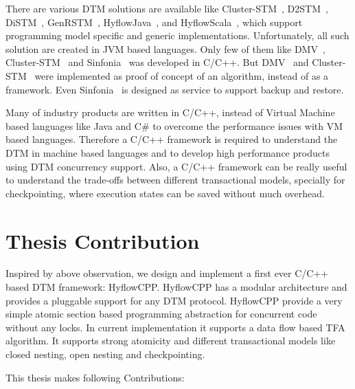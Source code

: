 \documentclass[12pt,english]{report}
\begin{document}
There are various DTM solutions are available like Cluster-STM~\cite{Bocchino:2008:STM:1345206.1345242}, D2STM~\cite{D2STM:5368778}, DiSTM~\cite{Kotselidis08distm:a}, GenRSTM~\cite{GenRSTM:6038614}, HyflowJava~\cite{Saad:2011:HHP:1996130.1996167}, and HyflowScala~\cite{turcuhyflow2}, which support programming model specific and generic implementations. Unfortunately, all such solution are created in JVM based languages. Only few of them like DMV~\cite{Manassiev:2006:EDV:1122971.1123002}, Cluster-STM~\cite{Bocchino:2008:STM:1345206.1345242} and Sinfonia~\cite{Aguilera:2009:SNP:1629087.1629088}  was developed in C/C++. But DMV~\cite{Manassiev:2006:EDV:1122971.1123002} and Cluster-STM~\cite{Bocchino:2008:STM:1345206.1345242}  were implemented as proof of concept of an algorithm, instead of as a framework. Even Sinfonia~\cite{Aguilera:2009:SNP:1629087.1629088} is designed as service to support backup and restore.

Many of industry products are written in C/C++, instead of Virtual Machine based languages like Java and C\# to overcome the performance issues with VM based languages. Therefore a C/C++ framework is required to understand the DTM in machine based languages and to develop high performance products using DTM concurrency support. Also, a C/C++ framework can be really useful to understand the trade-offs between different transactional models, specially for checkpointing, where execution states can be saved without much overhead. 

\section{Thesis Contribution}

Inspired by above observation, we design and implement a first ever C/C++ based DTM framework: HyflowCPP. HyflowCPP has a modular architecture and provides a pluggable support for any DTM protocol. HyflowCPP provide a very simple atomic section based programming abstraction for concurrent code without any locks. In current implementation it supports a data flow based TFA algorithm. It supports strong atomicity and different transactional models like closed nesting, open nesting and checkpointing.  

This thesis makes following Contributions:
\end{document}
